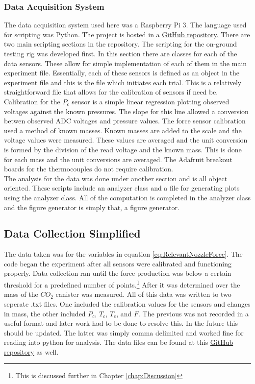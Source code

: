 \subsubsection{Data Acquisition System}
The data acquisition system used here was a Raspberry Pi 3. The language used for scripting was Python. The project is hosted in a \href{https://github.com/maxmhuggins/RCS_HAB/tree/master/On_Ground_Testing/Code}{GitHub repository.} There are two main scripting sections in the repository. The scripting for the on-ground testing rig was developed first. In this section there are classes for each of the data sensors. These allow for simple implementation of each of them in the main experiment file. Essentially, each of these sensors is defined as an object in the experiment file and this is the file which initiates each trial. This is a relatively straightforward file that allows for the calibration of sensors if need be. Calibration for the $P_c$ sensor is a simple linear regression plotting observed voltages against the known pressures. The slope for this line allowed a conversion betwen observed ADC voltages and pressure values. The force sensor calibration used a method of known masses. Known masses are added to the scale and the voltage values were measured. These values are averaged and the unit conversion is formed by the division of the read voltage and the known mass. This is done for each mass and the unit conversions are averaged. The Adafruit breakout boards for the thermocouples do not require calibration.\\
The analysis for the data was done under another section and is all object oriented. These scripts include an analyzer class and a file for generating plots using the analyzer class. All of the computation is completed in the analyzer class and the figure generator is simply that, a figure generator.
\subsection{Data Collection Simplified}
The data taken was for the variables in equation \ref{eq:RelevantNozzleForce}. The code began the experiment after all sensors were calibrated and functioning properly. Data collection ran until the force production was below a certain threshold for a predefined number of points.\footnote{This is discussed further in Chapter \ref{chap:Discussion}} After it was determined over the mass of the $CO_2$ canister was measured. All of this data was written to two seperate .txt files. One included the calibration values for the sensors and changes in mass, the other included $P_c$, $T_c$, $T_e$, and $F$. The previous was not recorded in a useful format and later work had to be done to resolve this. In the future this should be updated. The latter was simply comma delimited and worked fine for reading into python for analysis. The data files can be found at this \href{https://github.com/maxmhuggins/RCS_HAB/tree/master/On_Ground_Testing/Data_and_Analysis/Experimental_Data_Analysis/Refined_Data_Files}{GitHub repository} as well.